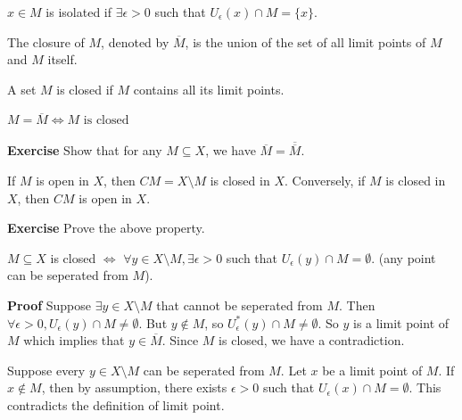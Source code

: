 \documentclass[main.tex]{subfiles}
\begin{document}
\begin{definition}
    $x\in M$ is isolated if $\exists \epsilon > 0$ such that $U_{\epsilon} (x) \cap M = \{x\}$.
\end{definition}

\begin{definition}
    The closure of $M$, denoted by $\overline{M}$, is the union of the set of all limit points of $M$ and $M$ itself.
\end{definition}
\begin{definition}
    A set $M$ is closed if $M$ contains all its limit points. 
\end{definition}
\begin{property}
    $M = \overline{M} \Longleftrightarrow M \text{ is closed}$
\end{property}
\par \noindent \textbf{Exercise} Show that for any $M \subseteq X$, we have $\overline{M} = \overline{\overline{M}}$. 
\begin{property}
    If $M$ is open in $X$, then $CM = X \setminus M$ is closed in $X$. Conversely, if $M$ is closed in $X$, then $CM$ is open in $X$.
\end{property}
\par \noindent \textbf{Exercise} Prove the above property. 

\begin{property}
    $M \subseteq X$ is closed $\Longleftrightarrow$ $\forall y\in X\setminus M, \exists \epsilon > 0$ such that $U_{\epsilon} (y) \cap M = \emptyset$. (any point can be seperated from $M$). 
\end{property}
\par \noindent \textbf{Proof} Suppose $\exists y \in X\setminus M$ that cannot be seperated from $M$. Then $\forall \epsilon > 0, U_{\epsilon} (y) \cap M \neq \emptyset$. But $y\notin M$, so $U_{\epsilon}^{\ast} (y) \cap M \neq \emptyset$. So $y$ is a limit point of $M$ which implies that $y\in \overline{M}$. Since $M$ is closed, we have a contradiction. 
\par Suppose every $y\in X\setminus M$ can be seperated from $M$. Let $x$ be a limit point of $M$. If $x \notin M$, then by assumption, there exists $\epsilon > 0$ such that $U_{\epsilon} (x) \cap M = \emptyset$. This contradicts the definition of limit point. 
\end{document}
